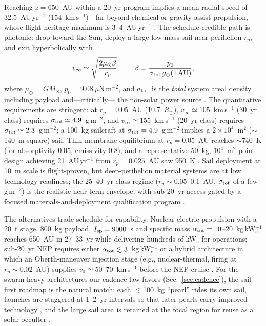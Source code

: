 ﻿\documentclass[twocolumn,10pt]{article}
\begin{document}
Reaching $z=650$~AU within a 20~yr program implies a mean radial speed
of 32.5~AU\,yr$^{-1}$ ($154$~km\,s$^{-1}$)---far beyond chemical or
gravity-assist propulsion, whose flight-heritage maximum is
3--4~AU\,yr$^{-1}$ \citep{tur26prop}. The schedule-credible path is
photonic: drop toward the Sun, deploy a large low-mass sail near
perihelion $r_p$, and exit hyperbolically with
\begin{equation}
v_\infty\simeq\sqrt{\frac{2\mu_\odot\beta}{r_p}},\qquad
\beta=\frac{p_0}{\sigma_{\rm tot}\,g_\odot(1\,{\rm AU})},
\end{equation}
where $\mu_\odot=GM_\odot$, $p_0=9.08~\mu$N\,m$^{-2}$, and
$\sigma_{\rm tot}$ is the
{\it total} system areal density including payload and---critically---
the non-solar power source \citep{tur26prop}. The quantitative
requirements are stringent: at $r_p=0.05$~AU (10.7~$R_\odot$),
$v_\infty\simeq105$~km\,s$^{-1}$ (30~yr class) requires
$\sigma_{\rm tot}\simeq4.9$~g\,m$^{-2}$, and
$v_\infty\simeq155$~km\,s$^{-1}$ (20~yr class) requires
$\sigma_{\rm tot}\simeq2.3$~g\,m$^{-2}$; a 100~kg sailcraft at
$\sigma_{\rm tot}=4.9$~g\,m$^{-2}$ implies a $2\times10^4$~m$^2$
($\sim$140~m square) sail. Thin-membrane equilibrium at $r_p=0.05$~AU
reaches $\sim$740~K (for absorptivity 0.05, emissivity 0.8), and a
representative 50~kg, $10^4$~m$^2$ point design achieving 21~AU\,yr$^{-1}$
from $r_p=0.025$~AU saw 950~K \citep{helvajian23}. Sail deployment at
10~m scale is flight-proven, but deep-perihelion material systems are at
low technology readiness; the 25--40~yr-class regime
($r_p\sim0.05$--0.1~AU, $\sigma_{\rm tot}$ of a few g\,m$^{-2}$) is the
realistic near-term envelope, with sub-20~yr access gated by a focused
materials-and-deployment qualification program \citep{tur26prop}.

The alternatives trade schedule for capability. Nuclear electric
propulsion with a 20~t stage, 800~kg payload, $I_{\rm sp}=9000$~s and
specific mass $\alpha_{\rm tot}=10$--20~kg\,kW$_e^{-1}$ reaches 650~AU
in 27--33~yr while delivering hundreds of kW$_e$ for operations; sub-20~yr
NEP requires either $\alpha_{\rm tot}\lesssim3$~kg\,kW$_e^{-1}$ or a
hybrid architecture in which an Oberth-maneuver injection stage
(e.g., nuclear-thermal, firing at $r_p\sim0.02$~AU) supplies
$v_0\simeq50$--70~km\,s$^{-1}$ before the NEP cruise
\citep{tur26prop}. For the swarm-heavy architectures our cadence law
favors (Sec.~\ref{sec:cadence}), the sail-first roadmap is the natural
match: each $\lesssim$100~kg ``pearl'' rides its own sail, launches are
staggered at 1--2~yr intervals so that later pearls carry improved
technology \citep{helvajian23}, and the large sail area is retained at
the focal region for reuse as a solar occulter \citep{tur26prop}.
\end{document}

